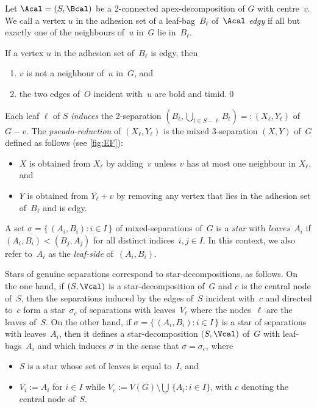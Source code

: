 \documentclass{aic}
\theoremstyle{plain}
\theoremstyle{definition}
\theoremstyle{plain}
\theoremstyle{plain}
\newcommand{\sm}{\setminus}
\begin{document}
Let $\Acal=(S,\Bcal)$ be a 2-connected apex-decomposition of $G$ with centre~$v$.
We call a vertex $u$ in the adhesion set of a leaf-bag~$B_\ell$ of~$\Acal$ \emph{edgy} if all but exactly one of the neighbours of~$u$ in~$G$ lie in~$B_\ell$.

\begin{obs}\label{edgySituation}
If a vertex $u$ in the adhesion set of~$B_\ell$ is edgy, then 
\begin{enumerate}
    \item $v$ is not a neighbour of~$u$ in~$G$, and
    \item the two edges of~$O$ incident with~$u$ are bold and timid.\qed
\end{enumerate}
\end{obs}

Each leaf $\ell$ of $S$ \emph{induces} the 2-separation $(B_\ell,\bigcup_{t\in S-\ell}B_t)=:(X_\ell,Y_\ell)$ of~$G-v$.
The \emph{pseudo-reduction} of $(X_\ell,Y_\ell)$ is the mixed 3-separation $(X,Y)$ of~$G$ defined as follows (see \autoref{fig:EF}):
\begin{itemize}
    \item $X$ is obtained from $X_\ell$ by adding~$v$ unless $v$ has at most one neighbour in $X_\ell$, and
    \item $Y$ is obtained from $Y_\ell+v$ by removing any vertex that lies in the adhesion set of~$B_\ell$ and is edgy.
\end{itemize}

A set $\sigma=\{\,(A_i,B_i): i\in I\,\}$ of mixed-separations of~$G$ is a \emph{star} with \emph{leaves}~$A_i$ if $(A_i,B_i)< (B_j,A_j)$ for all distinct indices~$i,j\in I$.
In this context, we also refer to~$A_i$ as the \emph{leaf-side} of~$(A_i,B_i)$.

\begin{eg}\label{starEG}
Stars of genuine separations correspond to star-decompositions, as follows.
On the one hand, if $(S,\Vcal)$ is a star-decomposition of~$G$ and $c$ is the central node of~$S$, then the separations induced by the edges of~$S$ incident with~$c$ and directed to~$c$ form a star~$\sigma_c$ of separations with leaves~$V_\ell$ where the nodes~$\ell$ are the leaves of~$S$.
On the other hand, if $\sigma=\{\,(A_i,B_i): i\in I\,\}$ is a star of separations with leaves~$A_i$, then it defines a star-decomposition $(S,\Vcal)$ of~$G$ with leaf-bags~$A_i$ and which induces $\sigma$ in the sense that $\sigma=\sigma_c$, where
\begin{itemize}
    \item $S$ is a star whose set of leaves is equal to~$I$, and
    \item $V_i:=A_i$ for $i\in I$ while $V_c:=V(G)\sm \bigcup\,\{A_i:i\in I\}$, with $c$ denoting the central node of~$S$.
\end{itemize}
\end{eg}
\end{document}
